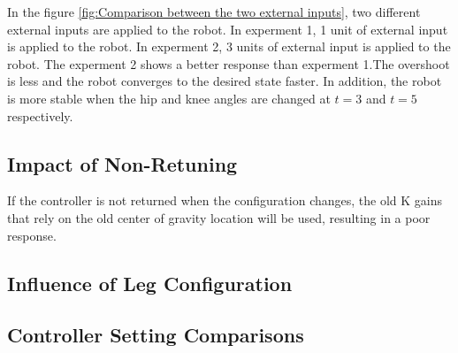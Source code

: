 In the figure \ref{fig:Comparison between the two external inputs}, two different external inputs are applied to the robot. In experment 1, 1 unit of external input is applied to the robot. In experment 2, 3 units of external input is applied to the robot. The experment 2 shows a better response than experment 1.The overshoot is less and the robot converges to the desired state faster. In addition, the robot is more stable when the hip and knee angles are changed at $t=3$ and $t=5$ respectively.
\subsection{Impact of Non-Retuning}

If the controller is not returned when the configuration changes, the old K gains that rely on the old center of gravity location will be used, resulting in a poor response.
\subsection{Influence of Leg Configuration}
\subsection{Controller Setting Comparisons}










	


